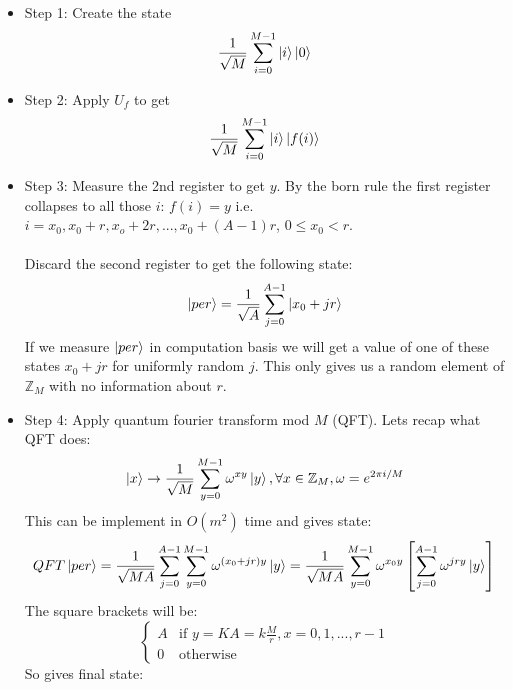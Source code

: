 \documentclass{article}
\begin{document}
\begin{enumerate}
                \begin{itemize}
                        \item Step 1: Create the state 
                                $$
                                \frac{1}{\sqrt{M}} \sum_{i=0}^{M-1} \ket{i} \ket{0}
                                $$
                        \item Step 2: Apply $U_f$ to get
                                $$
                                \frac{1}{\sqrt{M}} \sum_{i=0}^{M-1} \ket{i} \ket{f(i)}
                                $$
                        \item Step 3: Measure the 2nd register to get $y$. By the born rule the first register collapses to all those $i$: $f(i) =y$ i.e. $i = x_0, x_0 + r, x_o + 2r,..., x_0 + (A-1)r$, $0 \leq x_0 <r$.\\\\Discard the second register to get the following state:
                                $$
                                \ket{per} = \frac{1}{\sqrt{A}} \sum_{j=0}^{A-1} \ket{x_0 + jr}
                                $$
                         If we measure $\ket{per}$ in computation basis we will get a value of one of these states $x_0 + jr$ for uniformly random $j$. This only gives us a random element of $\mathbb{Z}_M$ with no information about $r$.
                        \item Step 4: Apply quantum fourier transform mod $M$ (QFT). Lets recap what QFT does:
                                $$
                                \ket{x} \rightarrow \frac{1}{\sqrt{M}} \sum_{y=0}^{M-1} \omega^{xy} \ket{y}, \forall x \in \mathbb{Z}_M, \omega = e^{2\pi i/ M}
                                $$
                                This can be implement in $O(m^2)$ time and gives state:
                                $$
                                QFT \ket{per} = \frac{1}{\sqrt{MA}} \sum_{j=0}^{A-1} \sum_{y=0}^{M-1}  \omega^{ (x_0 + jr)y} \ket{y} =  \frac{1}{\sqrt{MA}} \sum_{y=0}^{M-1} \omega^{x_0y}\left[  \sum_{j=0}^{A-1} \omega^{jry} \ket{y} \right]
                                $$
                        The square brackets will be:
                        $$
                        \begin{cases}
                                A & \text{if }y = KA= k\frac{M}{r}, x = 0, 1,..., r-1\\
                                0 & \text{otherwise}
                        \end{cases}
                        $$
                        So gives final state:

\end{itemize}
\end{enumerate}
\end{document}
